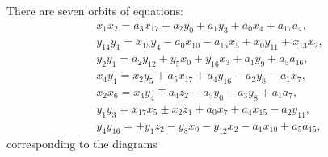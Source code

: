 \documentclass[pdftex]{sigma}
\numberwithin{equation}{section}
\theoremstyle{definition}
\begin{document}
There are seven orbits of equations:
\begin{gather}
x_1x_2 		= a_3x_{17} + a_2y_0 + a_1y_3 + a_0x_4 + a_{17}a_4, 				\tag{a}\\
y_{14}y_1 	= x_{15}y_4 - a_0x_{10} - a_{15}x_5 + x_0y_{11} + x_{13}x_2, 	\tag{b} \\
y_2y_1 		= a_2y_{12} + y_5x_0 + y_{16}x_3 + a_1y_9 + a_5a_{16} ,			\tag{c} \\
x_4y_1 		= x_2y_5 + a_5x_{17} + a_4y_{16} - a_2y_8 - a_1x_7 ,				\tag{d} \\
x_2x_6 		= x_4y_4 \mp a_4z_2 - a_5y_0 - a_3y_8 + a_1a_7 ,					\tag{e} \\
y_1y_3 		= x_{17}x_5 \pm x_2z_1 + a_0x_7 + a_4x_{15} - a_2y_{11},			\tag{f} \\
y_{4}y_{16} = \pm y_1z_2 - y_8x_0 - y_{12}x_2 - a_1x_{10} + a_5a_{15}, 			\tag{g}
\end{gather}
corresponding to the diagrams
\end{document}
